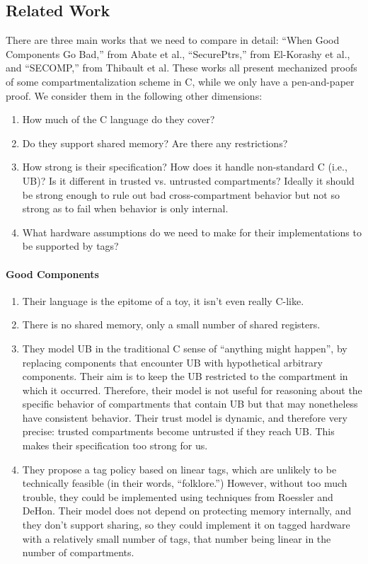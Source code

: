 \documentclass{article}
\begin{document}
\subsection{Related Work}

There are three main works that we need to compare in detail: ``When Good Components Go Bad,''
from Abate et al., ``SecurePtrs,'' from El-Korashy et al., and ``SECOMP,'' from Thibault et al.
These works all present mechanized proofs of some compartmentalization scheme in C, while we
only have a pen-and-paper proof. We consider them in the following other dimensions:
\begin{enumerate}
\item How much of the C language do they cover?
\item Do they support shared memory? Are there any restrictions?
\item How strong is their specification? How does it handle non-standard C (i.e., UB)?
  Is it different in trusted vs. untrusted compartments? Ideally it should be strong enough
  to rule out bad cross-compartment behavior but not so strong as to fail when behavior
  is only internal.
\item What hardware assumptions do we need to make for their implementations to be supported
  by tags?
\end{enumerate}

\paragraph{Good Components}

\begin{enumerate}
\item Their language is the epitome of a toy, it isn't even really C-like.
\item There is no shared memory, only a small number of shared registers.
\item They model UB in the traditional C sense of ``anything might happen'', by replacing
  components that encounter UB with hypothetical arbitrary components. Their aim is to keep
  the UB restricted to the compartment in which it occurred. Therefore, their model is not
  useful for reasoning about the specific behavior of compartments that contain UB but that
  may nonetheless have consistent behavior. Their trust model is dynamic, and therefore very
  precise: trusted compartments become untrusted if they reach UB.
  This makes their specification too strong for us.
\item They propose a tag policy based on linear tags, which are unlikely to be technically
  feasible (in their words, ``folklore.'') However, without too much trouble, they could be
  implemented using techniques from Roessler and DeHon. Their model does not depend on protecting
  memory internally, and they don't support sharing, so they could implement it on tagged hardware
  with a relatively small number of tags, that number being linear in the number of compartments.
\end{enumerate}
\end{document}
